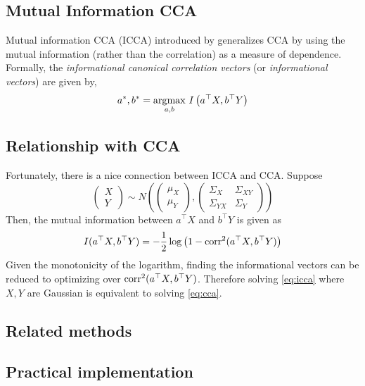 \documentclass[12pt]{article}
\begin{document}
\subsection{Mutual Information CCA}


Mutual information CCA (ICCA) introduced by \cite{Yin2004} generalizes CCA by using the mutual information (rather than the correlation) as a measure of dependence. Formally, the \textit{informational canonical correlation vectors} (or \textit{informational vectors}) are given by,
\begin{equation} \label{eq:icca}
    a^\ast, b^\ast = \underset{a, b}{{\arg\!\max}}\ I \left(a^\top X, b^\top Y \right)
\end{equation}

\subsection{Relationship with CCA}

Fortunately, there is a nice connection between ICCA and CCA. Suppose
\begin{equation}
    \begin{pmatrix} X \\ Y \end{pmatrix}
    \sim N \left(
    \begin{pmatrix} \mu_X \\ \mu_Y \end{pmatrix},
    \begin{pmatrix} \Sigma_{X} & \Sigma_{XY} \\ \Sigma_{YX} & \Sigma_Y \end{pmatrix}
    \right)
\end{equation}
Then, the mutual information between $a^\top X$ and $b^\top Y$ is given as
\begin{equation}
    I(a^\top X, b^\top Y) = -\frac{1}{2} \log \left(1 - \operatorname{corr}^2(a^\top X, b^\top Y) \right)
\end{equation}
Given the monotonicity of the logarithm, finding the informational vectors can be reduced to optimizing over $ \operatorname{corr}^2 (a^\top X, b^\top Y) $. Therefore solving \eqref{eq:icca} where $X, Y$ are Gaussian is equivalent to solving \eqref{eq:cca}.


\subsection{Related methods}




\subsection{Practical implementation}
\end{document}

